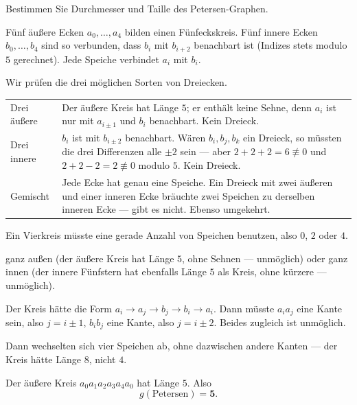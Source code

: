 \begin{aufgabe}
Bestimmen Sie Durchmesser und Taille des Petersen-Graphen.

\loesung
{}
Fünf äußere Ecken $a_0, \ldots, a_4$ bilden einen Fünfeckskreis. Fünf innere Ecken $b_0, \ldots, b_4$ sind so verbunden, dass $b_i$ mit $b_{i+2}$ benachbart ist (Indizes stets modulo $5$ gerechnet). Jede Speiche verbindet $a_i$ mit $b_i$.

Wir prüfen die drei möglichen Sorten von Dreiecken.
\begin{center}
{\small
\renewcommand{\arraystretch}{1.42}
\begin{tabular}{@{}P{2.6cm}P{5.4cm}@{}}
\toprule
Drei äußere & Der äußere Kreis hat Länge $5$; er enthält keine Sehne, denn $a_i$ ist nur mit $a_{i\pm1}$ und $b_i$ benachbart. Kein Dreieck.\\
Drei innere & $b_i$ ist mit $b_{i\pm 2}$ benachbart. Wären $b_i, b_j, b_k$ ein Dreieck, so müssten die drei Differenzen alle $\pm 2$ sein --- aber $2+2+2 = 6 \not\equiv 0$ und $2+2-2 = 2 \not\equiv 0$ modulo $5$. Kein Dreieck.\\
Gemischt & Jede Ecke hat genau eine Speiche. Ein Dreieck mit zwei äußeren und einer inneren Ecke bräuchte zwei Speichen zu derselben inneren Ecke --- gibt es nicht. Ebenso umgekehrt.\\
\bottomrule
\end{tabular}}
\end{center}

Ein Vierkreis müsste eine gerade Anzahl von Speichen benutzen, also $0$, $2$ oder $4$.

 ganz außen (der äußere Kreis hat Länge $5$, ohne Sehnen --- unmöglich) oder ganz innen (der innere Fünfstern hat ebenfalls Länge $5$ als Kreis, ohne kürzere --- unmöglich).

 Der Kreis hätte die Form $a_i \to a_j \to b_j \to b_i \to a_i$. Dann müsste $a_i a_j$ eine Kante sein, also $j = i \pm 1$,  $b_i b_j$ eine Kante, also $j = i \pm 2$. Beides zugleich ist unmöglich.

 Dann wechselten sich vier Speichen ab, ohne dazwischen andere Kanten --- der Kreis hätte Länge $8$, nicht $4$.

Der äußere Kreis $a_0 a_1 a_2 a_3 a_4 a_0$ hat Länge $5$. Also
\[ g(\text{Petersen}) = \mathbf{5} . \]


\end{aufgabe}
